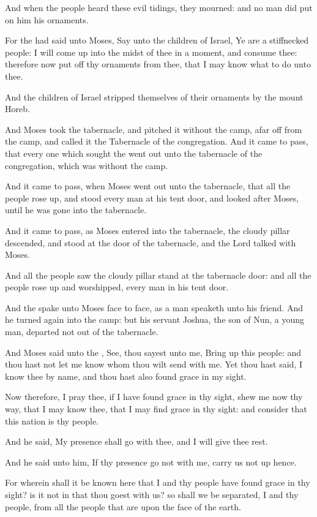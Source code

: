 \verse And when the people heard these evil tidings, they mourned: and
no man did put on him his ornaments.

\verse For the \LORD had said unto Moses, Say unto the children of
Israel, Ye are a stiffnecked people: I will come up into the midst of
thee in a moment, and consume thee: therefore now put off thy
ornaments from thee, that I may know what to do unto thee.

\verse And the children of Israel stripped themselves of their ornaments
by the mount Horeb.

\verse And Moses took the tabernacle, and pitched it without the camp,
afar off from the camp, and called it the Tabernacle of the
congregation. And it came to pass, that every one which sought the
\LORD went out unto the tabernacle of the congregation, which was
without the camp.

\verse And it came to pass, when Moses went out unto the tabernacle,
that all the people rose up, and stood every man at his tent door, and
looked after Moses, until he was gone into the tabernacle.

\verse And it came to pass, as Moses entered into the tabernacle, the
cloudy pillar descended, and stood at the door of the tabernacle, and
the Lord talked with Moses.

\verse And all the people saw the cloudy pillar stand at the tabernacle
door: and all the people rose up and worshipped, every man in his tent
door.

\verse And the \LORD spake unto Moses face to face, as a man speaketh
unto his friend. And he turned again into the camp: but his servant
Joshua, the son of Nun, a young man, departed not out of the
tabernacle.

\verse And Moses said unto the \LORD, See, thou sayest unto me, Bring up
this people: and thou hast not let me know whom thou wilt send with
me. Yet thou hast said, I know thee by name, and thou hast also found
grace in my sight.

\verse Now therefore, I pray thee, if I have found grace in thy sight,
shew me now thy way, that I may know thee, that I may find grace in
thy sight: and consider that this nation is thy people.

\verse And he said, My presence shall go with thee, and I will give
thee rest.

\verse And he said unto him, If thy presence go not with me, carry us
not up hence.

\verse For wherein shall it be known here that I and thy people have
found grace in thy sight? is it not in that thou goest with us? so
shall we be separated, I and thy people, from all the people that are
upon the face of the earth.

